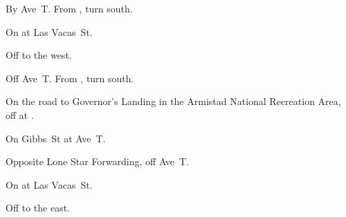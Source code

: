 
\begin{LocationList}

By Ave~T. From , turn south.

\Location{\GarageHQ \Garage}
On  at Las Vacas~St.

Off   to the west.

Off Ave~T. From , turn south.

On the road to Governor's Landing
in the Armistad National Recreation Area,  %
off  at .

On  Gibbs~St at Ave~T.

\Location{\TruckService \Service}
Opposite Lone Star Forwarding, off Ave~T.

On  at Las Vacas~St.

Off   to the east.

\end{LocationList}
